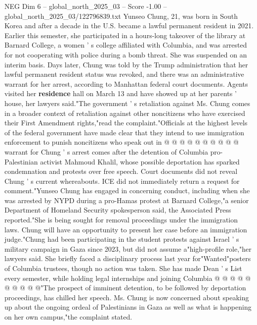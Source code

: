 \begin{textsample}{NEG Dim 6 – global\_north\_2025\_03 – Score -1.00 – global\_north\_2025\_03/122796839.txt}  \label{ex:f6_neg_228}
Yunseo Chung, 21, was born in South Korea and after a decade in the U.S. became a lawful permanent resident in 2021.
Earlier this semester, she participated in a hours-long takeover of the library at Barnard College, a women ' s college affiliated with Columbia, and was arrested for not cooperating with police during a bomb threat.
She was suspended on an interim basis.
Days later, Chung was told by the Trump administration that her lawful permanent resident status was revoked, and there was an administrative warrant for her arrest, according to Manhattan federal court documents.
Agents visited her \textbf{residence} hall on March 13 and have showed up at her parents ' house, her lawyers said."The government ' s retaliation against Ms.
Chung comes in a broader context of retaliation against other noncitizens who have exercised their First Amendment rights,"read the complaint."Officials at the highest levels of the federal government have made clear that they intend to use immigration enforcement to punish noncitizens who speak out in @ @ @ @ @ @ @ @ @ @ warrant for Chung ' s arrest comes after the detention of Columbia pro-Palestinian activist Mahmoud Khalil, whose possible deportation has sparked condemnation and protests over free speech.
Court documents did not reveal Chung ' s current whereabouts.
ICE did not immediately return a request for comment."Yunseo Chung has engaged in concerning conduct, including when she was arrested by NYPD during a pro-Hamas protest at Barnard College,"a senior Department of Homeland Security spokesperson said, the Associated Press reported."She is being sought for removal proceedings under the immigration laws.
Chung will have an opportunity to present her case before an immigration judge."Chung had been participating in the student protests against Israel ' s military campaign in Gaza since 2023, but did not assume a"high-profile role,"her lawyers said.
She briefly faced a disciplinary process last year for"Wanted"posters of Columbia trustees, though no action was taken.
She has made Dean ' s List every semester, while holding legal internships and joining Columbia @ @ @ @ @ @ @ @ @ @"The prospect of imminent detention, to be followed by deportation proceedings, has chilled her speech.
Ms.
Chung is now concerned about speaking up about the ongoing ordeal of Palestinians in Gaza as well as what is happening on her own campus,"the complaint stated.

\end{textsample}
